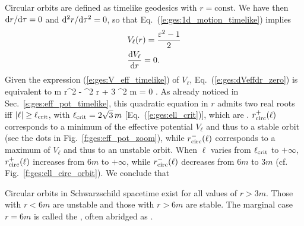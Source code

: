 Circular orbits are defined as timelike geodesics with $r = \mathrm{const}$.
We have then $\mathrm{d} r/\mathrm{d}\tau = 0$ and $\mathrm{d}^2 r/\mathrm{d}\tau^2 = 0$, so that
Eq.~(\ref{e:ges:1d_motion_timelike}) implies
\begin{subequations}
\begin{align}
& V_{\ell}(r) = \frac{\varepsilon^2 - 1}{2} \label{e:ges:Veff_circ} \\
& \frac{\mathrm{d} V_{\ell}}{\mathrm{d} r} = 0 . \label{e:ges:dVeffdr_zero}
\end{align}
\end{subequations}
Given the expression (\ref{e:ges:V_eff_timelike}) of $V_{\ell}$,
Eq.~(\ref{e:ges:dVeffdr_zero}) is equivalent to
\be \label{e:ges:eq_r_ell_circ}
    m r^2 - \ell^2 r + 3 \ell^2 m = 0 .
\ee
As already noticed in Sec.~\ref{s:ges:eff_pot_timelike}, this
quadratic equation in $r$ admits two real roots iff $|\ell| \geq \ell_{\rm crit}$,
with $\ell_{\rm crit} = 2\sqrt{3}\, m$ [Eq.~(\ref{e:ges:ell_crit})],
which are
\be \label{e:ges:r_circ_ell}
    .
\ee
$r_{\rm circ}^+(\ell)$ corresponds to a minimum of the effective potential
$V_{\ell}$ and thus
to a stable orbit (see the dots in Fig.~\ref{f:ges:eff_pot_zoom}),
while $r_{\rm circ}^-(\ell)$ corresponds to a
maximum of $V_{\ell}$ and thus to an unstable orbit.
When $\ell$ varies from $\ell_{\rm crit}$ to $+\infty$,
$r_{\rm circ}^+(\ell)$ increases from $6 m$ to $+\infty$, while
$r_{\rm circ}^-(\ell)$ decreases from $6 m$ to $3 m$ (cf. Fig.~\ref{f:ges:ell_circ_orbit}). We conclude that
\begin{prop}
Circular orbits in Schwarzschild spacetime exist for all values of $r>3m$.
Those with $r<6m$ are unstable and those with $r>6m$ are stable. The marginal
case $r=6m$ is called the
, often abridged as .
\end{prop}

